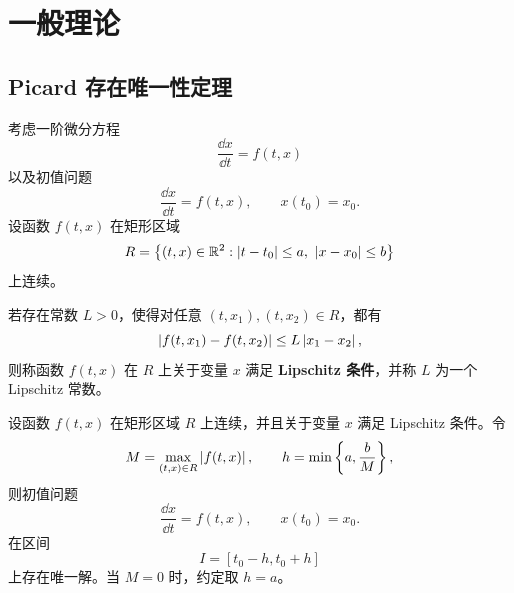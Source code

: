 \setchapterintro{}
\chapter{一般理论}\label{chap:一般理论}

\section{Picard 存在唯一性定理}\label{sec:Picard存在唯一性定理}

考虑一阶微分方程
\[
	\dfrac{\dd x}{\dd t}=f(t,x)
\]
以及初值问题
\[
	\dfrac{\dd x}{\dd t}=f(t,x),
	\qquad
	x(t_0)=x_0.
\]
设函数 $f(t,x)$ 在矩形区域
\[
	R=\bigl\{(t,x)\in\R^2:\abs{t-t_0}\leq a,\ \abs{x-x_0}\leq b\bigr\}
\]
上连续。

\begin{definition}\label{def:关于x的Lipschitz条件}
	若存在常数 $L>0$，使得对任意
	$(t,x_1),(t,x_2)\in R$，都有
	\[
		\left| f(t,x_1)-f(t,x_2) \right|
		\leq L\left| x_1-x_2 \right|,
	\]
	则称函数 $f(t,x)$ 在 $R$ 上关于变量 $x$ 满足
	\textbf{Lipschitz 条件}，并称 $L$ 为一个 Lipschitz 常数。
\end{definition}

\begin{theorem}\label{thm:Picard存在唯一性定理}
	设函数 $f(t,x)$ 在矩形区域 $R$ 上连续，并且关于变量 $x$
	满足 Lipschitz 条件。令
	\[
		M=\max_{(t,x)\in R}\left| f(t,x) \right|,
		\qquad
		h=\min\left\{a,\dfrac{b}{M}\right\},
	\]
	则初值问题
	\[
	\dfrac{\dd x}{\dd t}=f(t,x),
	\qquad
	x(t_0)=x_0.
	\]在区间
	\[
		I=[t_0-h,t_0+h]
	\]
	上存在唯一解。当 $M=0$ 时，约定取 $h=a$。
\end{theorem}

